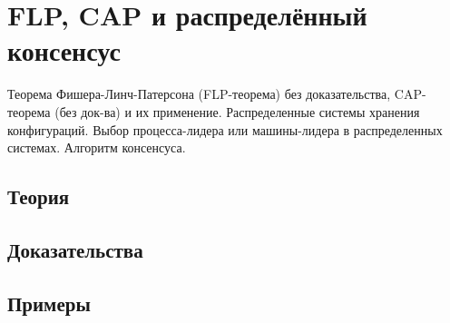 
\section{FLP, CAP и распределённый консенсус}
\label{sec:1.3.13-flp-cap-consensus}

\begin{ticket}
Теорема Фишера-Линч-Патерсона (FLP-теорема) без доказательства, CAP-теорема (без док-ва) и их применение. Распределенные системы хранения конфигураций. Выбор процесса-лидера или машины-лидера в распределенных системах. Алгоритм консенсуса.
\end{ticket}

\subsection*{Теория}

\subsection*{Доказательства}

\subsection*{Примеры}
